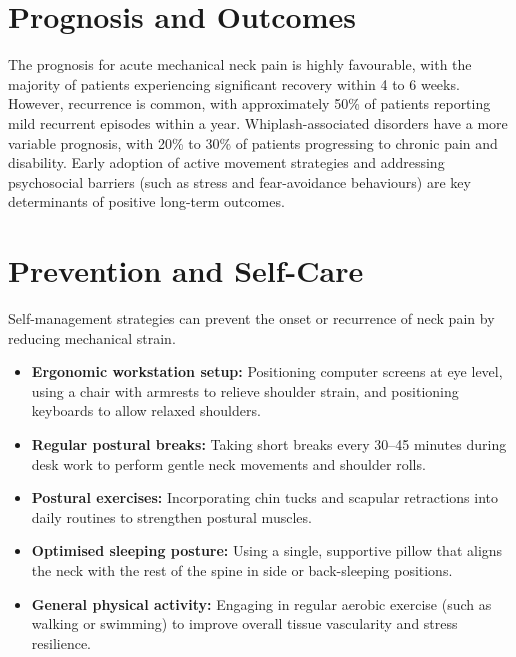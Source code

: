 \section*{Prognosis and Outcomes}
The prognosis for acute mechanical neck pain is highly favourable, with the majority of patients experiencing significant recovery within 4 to 6 weeks. However, recurrence is common, with approximately 50\% of patients reporting mild recurrent episodes within a year. Whiplash-associated disorders have a more variable prognosis, with 20\% to 30\% of patients progressing to chronic pain and disability. Early adoption of active movement strategies and addressing psychosocial barriers (such as stress and fear-avoidance behaviours) are key determinants of positive long-term outcomes.

\section*{Prevention and Self-Care}
Self-management strategies can prevent the onset or recurrence of neck pain by reducing mechanical strain.
\begin{itemize}
    \item \textbf{Ergonomic workstation setup:} Positioning computer screens at eye level, using a chair with armrests to relieve shoulder strain, and positioning keyboards to allow relaxed shoulders.
    \item \textbf{Regular postural breaks:} Taking short breaks every 30--45 minutes during desk work to perform gentle neck movements and shoulder rolls.
    \item \textbf{Postural exercises:} Incorporating chin tucks and scapular retractions into daily routines to strengthen postural muscles.
    \item \textbf{Optimised sleeping posture:} Using a single, supportive pillow that aligns the neck with the rest of the spine in side or back-sleeping positions.
    \item \textbf{General physical activity:} Engaging in regular aerobic exercise (such as walking or swimming) to improve overall tissue vascularity and stress resilience.
\end{itemize}

